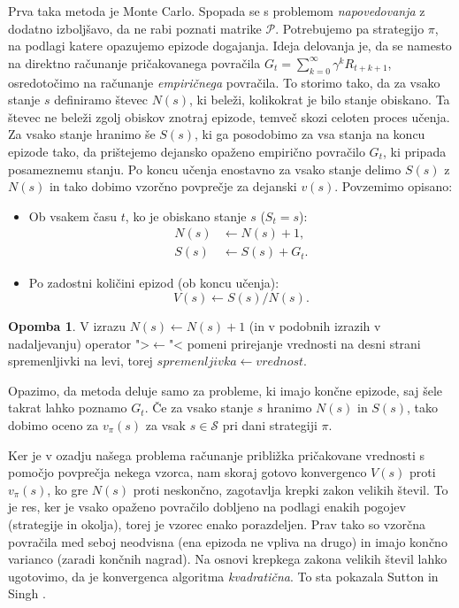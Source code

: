 \documentclass[12pt,a4paper]{amsart}
\theoremstyle{definition} %
\newtheorem{opomba}[definicija]{Opomba}
\theoremstyle{plain} %
\begin{document}
Prva taka metoda je Monte Carlo. Spopada se s problemom \textit{napovedovanja} z dodatno izboljšavo, 
da ne rabi poznati matrike $\mathcal{P}$. Potrebujemo pa strategijo $\pi$, na podlagi katere opazujemo
epizode dogajanja. Ideja delovanja je, da se namesto na direktno računanje pričakovanega povračila
$G_t = \sum_{k=0}^\infty \gamma^k R_{t + k + 1}$, osredotočimo na računanje \textit{empiričnega} 
povračila. To storimo tako, da za vsako stanje $s$ definiramo števec $N(s)$, ki beleži, kolikokrat 
je bilo stanje obiskano. Ta števec ne beleži zgolj obiskov znotraj epizode, temveč skozi celoten 
proces učenja. Za vsako stanje hranimo še $S(s)$, ki ga posodobimo za vsa stanja na koncu epizode
tako, da prištejemo dejansko opaženo empirično povračilo $G_t$, ki pripada posameznemu stanju.
Po koncu učenja enostavno za vsako stanje delimo $S(s)$ z $N(s)$ in tako dobimo vzorčno povprečje za 
dejanski $v(s)$. Povzemimo opisano:
\begin{itemize}
    \item Ob vsakem času $t$, ko je obiskano stanje $s$ ($S_t = s$): 
        \begin{align*}
            N(s) &\leftarrow N(s) + 1, \\
            S(s) &\leftarrow S(s) + G_t.
        \end{align*}
    \item Po zadostni količini epizod (ob koncu učenja): 
        $$
        V(s) \leftarrow S(s) / N(s).
        $$
\end{itemize}

\begin{opomba}
    V izrazu $N(s) \leftarrow N(s) + 1$ (in v podobnih izrazih v nadaljevanju) operator ">$\leftarrow$"<
    pomeni prirejanje vrednosti na desni strani spremenljivki na levi, torej $spremenljivka \leftarrow vrednost$.
\end{opomba}

Opazimo, da metoda deluje samo za probleme, ki imajo končne epizode, saj šele takrat lahko poznamo $G_t$. 
Če za vsako stanje $s$ hranimo $N(s)$ in $S(s)$, tako dobimo oceno za $v_\pi(s)$ za vsak $s \in 
\mathcal{S}$ pri dani strategiji $\pi$.

Ker je v ozadju našega problema računanje približka pričakovane vrednosti s pomočjo povprečja nekega 
vzorca, nam skoraj gotovo konvergenco $V(s)$ proti $v_\pi(s)$, ko gre $N(s)$ proti neskončno,
zagotavlja krepki zakon velikih števil. To je res, ker je vsako opaženo povračilo dobljeno na podlagi 
enakih pogojev (strategije in okolja), torej je vzorec enako porazdeljen. Prav tako so vzorčna povračila 
med seboj neodvisna (ena epizoda ne vpliva na drugo) in imajo končno varianco (zaradi končnih nagrad). 
Na osnovi krepkega zakona velikih števil lahko ugotovimo, da je konvergenca algoritma \textit{kvadratična}. 
To sta pokazala Sutton in Singh \cite{MCdokaz}.
\end{document}
